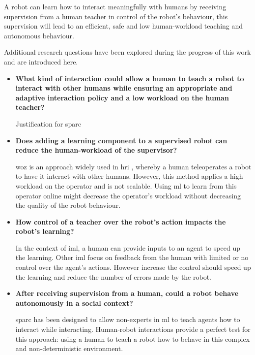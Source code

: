 A robot can learn how to interact meaningfully with humans by receiving supervision from a human teacher in control of the robot's behaviour, this supervision will lead to an efficient, safe and low human-workload teaching and autonomous behaviour.

Additional research questions have been explored during the progress of this
work and are introduced here.

\begin{itemize}
    \item \textbf{What kind of interaction could allow a human to teach a robot to interact with other humans while ensuring an appropriate and adaptive interaction policy and a low workload on the human teacher?}
    
    	Justification for \gls{sparc} 
    \item \textbf{Does adding a learning component to a supervised robot can reduce the human-workload of the supervisor?}
    
        \gls{woz} is an approach widely used in \gls{hri} \citep{riek2012wizard}, whereby a human teleoperates a robot to have it interact with other humans. However, this method applies a high workload on the operator and is not scalable. Using \gls{ml} to learn from this operator online might decrease the operator's workload without decreasing the quality of the robot behaviour.
    
    \item \textbf{How control of a teacher over the robot's action impacts the robot's learning?} 
    
	    In the context of \gls{iml}, a human can provide inputs to an agent to speed up the learning. Other \gls{iml} \citep{thomaz2008teachable,knox2009interactively} focus on feedback from the human with limited or no control over the agent's actions. However increase the control should speed up the learning and reduce the number of errors made by the robot.

    \item \textbf{After receiving supervision from a human, could a robot behave autonomously in a social context?}

	 	\gls{sparc} has been designed to allow non-experts in \gls{ml} to teach agents how to interact while interacting. Human-robot interactions provide a perfect test for this approach: using a human to teach a robot how to behave in this complex and non-deterministic environment.
	 
\end{itemize}

